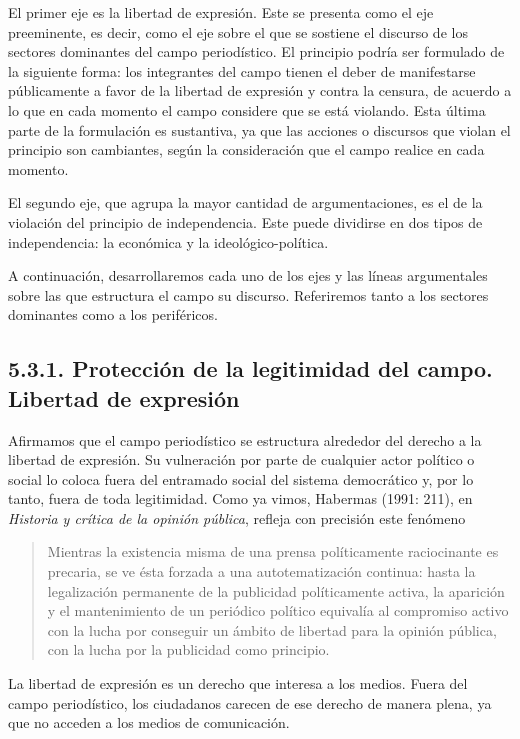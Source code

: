{El primer eje es la libertad de expresión. Este se presenta como el eje preeminente, es decir, como el eje sobre el que se sostiene el discurso de los sectores dominantes del campo periodístico. El principio podría ser formulado de la siguiente forma: los integrantes del campo tienen el deber de manifestarse públicamente a favor de la libertad de expresión y contra la censura, de acuerdo a lo que en cada momento el campo considere que se está violando. Esta última parte de la formulación es sustantiva, ya que las acciones o discursos que violan el principio son cambiantes, según la consideración que el campo realice en cada momento.

El segundo eje, que agrupa la mayor cantidad de argumentaciones, es el de la violación del principio de independencia. Este puede dividirse en dos tipos de independencia: la económica y la ideológico-política.

A continuación, desarrollaremos cada uno de los ejes y las líneas argumentales sobre las que estructura el campo su discurso. Referiremos tanto a los sectores dominantes como a los periféricos.

\subsection{5.3.1. Protección de la legitimidad del campo. Libertad de expresión}

Afirmamos que el campo periodístico se estructura alrededor del derecho a la libertad de expresión. Su vulneración por parte de cualquier actor político o social lo coloca fuera del entramado social del sistema democrático y, por lo tanto, fuera de toda legitimidad. Como ya vimos, Habermas (1991: 211), en \emph{Historia y crítica de la opinión pública}, refleja con precisión este fenómeno

\begin{quote}
Mientras la existencia misma de una prensa políticamente raciocinante es precaria, se ve ésta forzada a una autotematización continua: hasta la legalización permanente de la publicidad políticamente activa, la aparición y el mantenimiento de un periódico político equivalía al compromiso activo con la lucha por conseguir un ámbito de libertad para la opinión pública, con la lucha por la publicidad como principio.
\end{quote}

La libertad de expresión es un derecho que interesa a los medios. Fuera del campo periodístico, los ciudadanos carecen de ese derecho de manera plena, ya que no acceden a los medios de comunicación.

}
